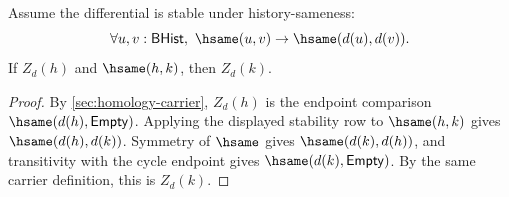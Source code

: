 \begin{theorem}
\label{thm:homology-cycle-carrier-hsame-transport}
Assume the differential is stable under history-sameness:
$$
\forall u,v:\mathsf{BHist},\ \hsame(u,v)\to\hsame(d(u),d(v)).
$$
If $Z_d(h)$ and $\hsame(h,k)$, then $Z_d(k)$.
\end{theorem}
\begin{proof}
By \autoref{sec:homology-carrier}, $Z_d(h)$ is the endpoint comparison
$\hsame(d(h),\mathsf{Empty})$. Applying the displayed stability row to
$\hsame(h,k)$ gives $\hsame(d(h),d(k))$. Symmetry of $\hsame$ gives
$\hsame(d(k),d(h))$, and transitivity with the cycle endpoint gives
$\hsame(d(k),\mathsf{Empty})$. By the same carrier definition, this is
$Z_d(k)$.
\end{proof}
